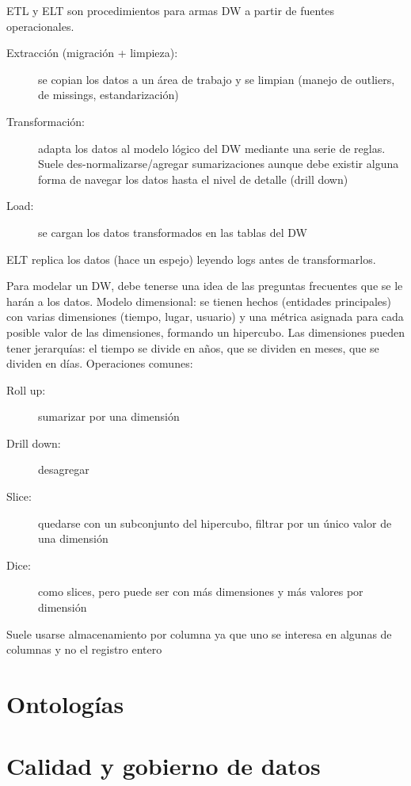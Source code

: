ETL y ELT son procedimientos para armas DW a partir de fuentes operacionales.

\begin{description}
	\item[Extracción (migración + limpieza):] se copian los datos a un área de trabajo y se limpian (manejo de outliers, de missings, estandarización)
	\item[Transformación:] adapta los datos al modelo lógico del DW mediante una serie de reglas. Suele des-normalizarse/agregar sumarizaciones aunque debe existir alguna forma de navegar los datos hasta el nivel de detalle (drill down)
	\item[Load:] se cargan los datos transformados en las tablas del DW
\end{description}

ELT replica los datos (hace un espejo) leyendo logs antes de transformarlos.

Para modelar un DW, debe tenerse una idea de las preguntas frecuentes que se le harán a los datos.
Modelo dimensional: se tienen hechos (entidades principales) con varias dimensiones (tiempo, lugar, usuario) y una métrica asignada para cada posible valor de las dimensiones, formando un hipercubo.
Las dimensiones pueden tener jerarquías: el tiempo se divide en años, que se dividen en meses, que se dividen en días.
Operaciones comunes:

\begin{description}
	\item[Roll up:] sumarizar por una dimensión
	\item[Drill down:] desagregar
	\item[Slice:] quedarse con un subconjunto del hipercubo, filtrar por un único valor de una dimensión
	\item[Dice:] como slices, pero puede ser con más dimensiones y más valores por dimensión
\end{description}

Suele usarse almacenamiento por columna ya que uno se interesa en algunas de columnas y no el registro entero

\section{Ontologías}

\section{Calidad y gobierno de datos}

